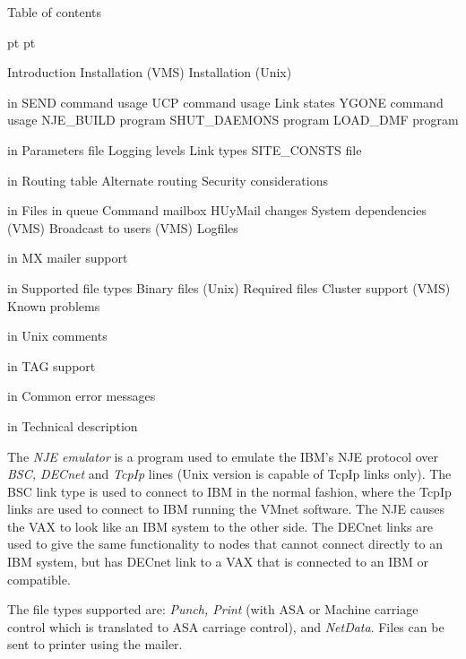 \centerline{\ncrBig Table of contents}

{\obeyspaces\obeylines{} pt  pt \narrower

Introduction 
Installation (VMS) 
Installation (Unix)  

 in
SEND command usage 
UCP command usage 
Link states  
YGONE command usage  
NJE\_BUILD program   
SHUT\_DAEMONS program 
LOAD\_DMF program  

 in
Parameters file 
Logging levels 
Link types  
SITE\_CONSTS file  

 in
Routing table  
Alternate routing 
Security considerations 

 in
Files in queue 
Command mailbox 
HUyMail changes 
System dependencies (VMS)  
Broadcast to users (VMS) 
Logfiles 

 in
MX mailer support 

 in
Supported file types 
Binary files (Unix)  
Required files 
Cluster support (VMS) 
Known problems 

 in
Unix comments  

 in
TAG support 

 in
Common error messages 

 in
Technical description 
}
\vfill\eject



The  {\sl NJE emulator} is a program used to emulate the IBM's NJE protocol
over {\sl BSC, DECnet} and {\sl TcpIp} lines (Unix version is capable of
TcpIp links
only).  The  BSC  link  type  is  used  to  connect to IBM in the normal
fashion, where the TcpIp links are used to connect to  IBM  running  the
VMnet software. The NJE causes the VAX to look like an IBM system to the
other side. The DECnet links are used to give the same functionality  to
nodes that cannot connect directly to an IBM system, but has DECnet link
to a VAX that is connected to an IBM or compatible.

The file types supported are:  {\sl Punch,  Print} (with  ASA  or  Machine
carriage  control  which  is  translated  to  ASA carriage control), and
{\sl NetData}. Files can be sent to printer using the mailer.

